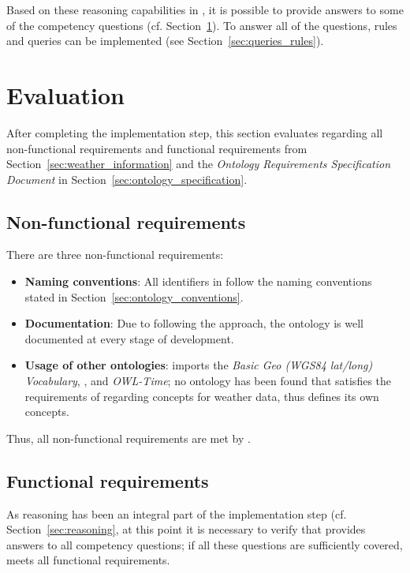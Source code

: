 Based on these reasoning capabilities in \smarthomeweather, it is possible to provide answers to some of the competency questions (cf. Section~\ref{sec:ontology_evaluation}). To answer all of the questions,  rules and  queries can be implemented (see Section~\ref{sec:queries_rules}).

\section{Evaluation}
\label{sec:ontology_evaluation}

After completing the implementation step, this section evaluates \smarthomeweather regarding all non-functional requirements and functional requirements from Section~\ref{sec:weather_information} and the \emph{Ontology Requirements Specification Document} in Section~\ref{sec:ontology_specification}.

\subsection{Non-functional requirements}
\label{sec:evaluation_non_functional}

There are three non-functional requirements:

\begin{itemize}
  \item \textbf{Naming conventions}: All identifiers in \smarthomeweather follow the naming conventions stated in Section~\ref{sec:ontology_conventions}.
  \item \textbf{Documentation}: Due to following the \methontology approach, the ontology is well documented at every stage of development.
  \item \textbf{Usage of other ontologies}: \smarthomeweather imports the \emph{Basic Geo (WGS84 lat/long) Vocabulary}, \muo, and \emph{OWL-Time}; no ontology has been found that satisfies the requirements of \smarthomeweather regarding concepts for weather data, thus \smarthomeweather defines its own concepts.
\end{itemize}

Thus, all non-functional requirements are met by \smarthomeweather.

\subsection{Functional requirements}
\label{sec:evaluation_functional}

As  reasoning has been an integral part of the implementation step (cf. Section~\ref{sec:reasoning}, at this point it is necessary to verify that \smarthomeweather provides answers to all competency questions; if all these questions are sufficiently covered, \smarthomeweather meets all functional requirements.

